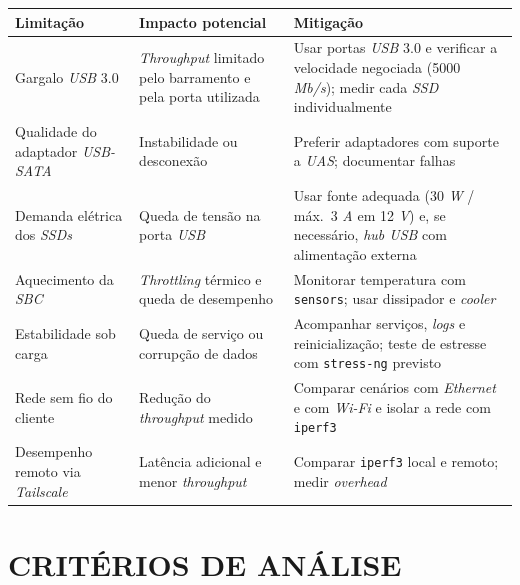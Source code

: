 \begin{quadro}[H]
    \centering
    \small
    \renewcommand{\arraystretch}{1.15}
    \begin{tabularx}{\linewidth}{|>{\raggedright\arraybackslash}X|>{\raggedright\arraybackslash}X|>{\raggedright\arraybackslash}X|}
        \hline
        \textbf{Limitação} & \textbf{Impacto potencial} & \textbf{Mitigação} \\
        \hline
        \hline
        Gargalo \textit{USB} 3.0 & \textit{Throughput} limitado pelo barramento e pela porta utilizada & Usar portas \textit{USB} 3.0 e verificar a velocidade negociada (5000 \textit{Mb/s}); medir cada \textit{SSD} individualmente \\
        \hline
        Qualidade do adaptador \textit{USB-SATA} & Instabilidade ou desconexão & Preferir adaptadores com suporte a \textit{UAS}; documentar falhas \\
        \hline
        Demanda elétrica dos \textit{SSDs} & Queda de tensão na porta \textit{USB} & Usar fonte adequada (30 \textit{W} / máx.\ 3 \textit{A} em 12 \textit{V}) e, se necessário, \textit{hub USB} com alimentação externa \\
        \hline
        Aquecimento da \textit{SBC} & \textit{Throttling} térmico e queda de desempenho & Monitorar temperatura com \texttt{sensors}; usar dissipador e \textit{cooler} \\
        \hline
        Estabilidade sob carga & Queda de serviço ou corrupção de dados & Acompanhar serviços, \textit{logs} e reinicialização; teste de estresse com \texttt{stress-ng} previsto \\
        \hline
        Rede sem fio do cliente & Redução do \textit{throughput} medido & Comparar cenários com \textit{Ethernet} e com \textit{Wi-Fi} e isolar a rede com \texttt{iperf3} \\
        \hline
        Desempenho remoto via \textit{Tailscale} & Latência adicional e menor \textit{throughput} & Comparar \texttt{iperf3} local e remoto; medir \textit{overhead} \\
        \hline
    \end{tabularx}
    \vspace{0.2cm}
    \fonteautoria
\end{quadro}

\section{CRITÉRIOS DE ANÁLISE}

